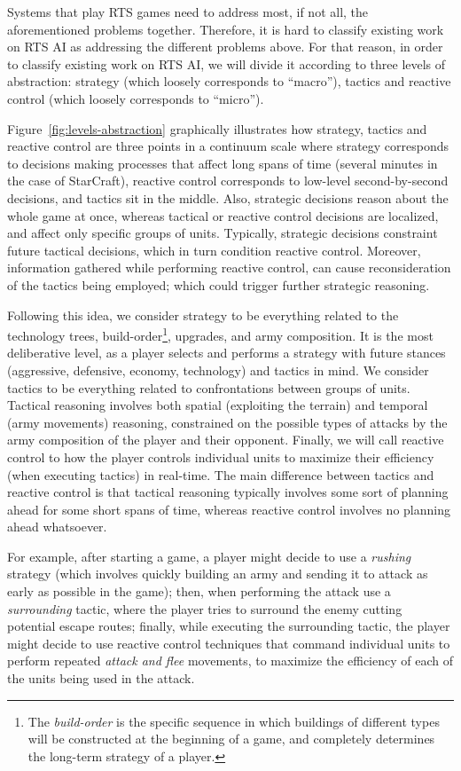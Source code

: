 \documentclass[journal]{IEEEtran}
\begin{document}
Systems that play RTS games need to address most, if not all, the aforementioned problems together. Therefore, it is hard to classify existing work on RTS AI as addressing the different problems above. For that reason, in order to classify existing work on RTS AI, we will divide it according to three levels of abstraction: strategy (which loosely corresponds to ``macro''), tactics and reactive control (which loosely corresponds to ``micro''). 

Figure~\ref{fig:levels-abstraction} graphically illustrates how strategy, tactics and reactive control are three points in a continuum scale where strategy corresponds to decisions making processes that affect long spans of time (several minutes in the case of StarCraft), reactive control corresponds to low-level second-by-second decisions, and tactics sit in the middle. Also, strategic decisions reason about the whole game at once, whereas tactical or reactive control decisions are localized, and affect only specific groups of units. Typically, strategic decisions constraint future tactical decisions, which in turn condition reactive control. Moreover, information gathered while performing reactive control, can cause reconsideration of the tactics being employed; which could trigger further strategic reasoning.

Following this idea, we consider strategy to be everything related to the technology trees, build-order\footnote{The {\em build-order} is the specific sequence in which buildings of different types will be constructed at the beginning of a game, and completely determines the long-term strategy of a player.}, upgrades, and army composition. It is the most deliberative level, as a player selects and performs a strategy with future stances (aggressive, defensive, economy, technology) and tactics in mind. We consider tactics to be everything related to confrontations between groups of units. Tactical reasoning involves both spatial (exploiting the terrain) and temporal (army movements) reasoning, constrained on the possible types of attacks by the army composition of the player and their opponent. Finally, we will call reactive control to how the player controls individual units to maximize their efficiency (when executing tactics) in real-time. The main difference between tactics and reactive control is that tactical reasoning typically involves some sort of planning ahead for some short spans of time, whereas reactive control involves no planning ahead whatsoever.

For example, after starting a game, a player might decide to use a {\em rushing} strategy (which involves quickly building an army and sending it to attack as early as possible in the game); then, when performing the attack use a {\em surrounding} tactic, where the player tries to surround the enemy cutting potential escape routes; finally, while executing the surrounding tactic, the player might decide to use reactive control techniques that command individual units to perform repeated {\em attack and flee} movements, to maximize the efficiency of each of the units being used in the attack.
\end{document}
